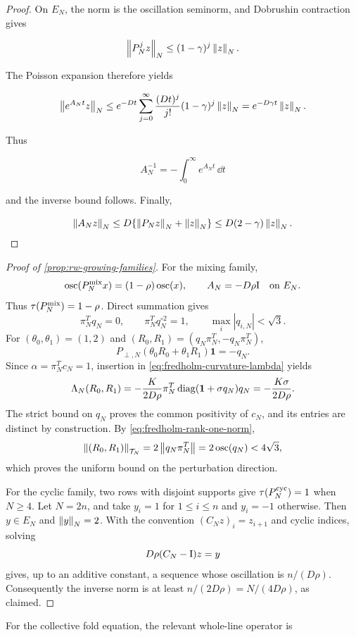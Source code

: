 \begin{proof}
On \(E_N\), the norm is the oscillation seminorm, and Dobrushin
contraction gives

\[
 \left\lVert P_N^jz\right\rVert_N\le(1-\gamma)^j\left\lVert z\right\rVert_N.
\]

The Poisson expansion therefore yields

\[
 \left\lVert e^{A_Nt}z\right\rVert_N
 \le e^{-Dt}\sum_{j=0}^\infty
       \frac{(Dt)^j}{j!}(1-\gamma)^j\left\lVert z\right\rVert_N
 =e^{-D\gamma t}\left\lVert z\right\rVert_N.
\]

Thus

\[
 A_N^{-1}=-\int_0^\infty e^{A_Nt}\,\dd t
\]

and the inverse bound follows.  Finally,

\[
 \left\lVert A_Nz\right\rVert_N
 \le D\{\left\lVert P_Nz\right\rVert_N+\left\lVert z\right\rVert_N\}
 \le D(2-\gamma)\left\lVert z\right\rVert_N.
\]
\end{proof}

\begin{proof}[Proof of \cref{prop:rw-growing-families}]

For the mixing family,
\[
 \operatorname{osc}(P_N^{\rm mix}x)=(1-\rho)\operatorname{osc}(x),
 \qquad
 A_N=-D\rho\mathrm I\quad\hbox{on }E_N.
\]
Thus \(\tau(P_N^{\rm mix})=1-\rho\).  Direct summation gives
\[
 \pi_N^Tq_N=0,
 \qquad \pi_N^Tq_N^{\circ2}=1,
 \qquad \max_i|q_{i,N}|<\sqrt3.
\]
For \((\theta_0,\theta_1)=(1,2)\) and
\((R_0,R_1)=(q_N\pi_N^T,-q_N\pi_N^T)\),
\[
 P_{\perp,N}\left(\theta_0R_0+\theta_1R_1\right)\mathbf1=-q_N.
\]
Since \(\alpha=\pi_N^Tc_N=1\), insertion in
\cref{eq:fredholm-curvature-lambda} yields
\[
 \Lambda_N(R_0,R_1)
 =-\frac{K}{2D\rho}\pi_N^T\operatorname{diag}(\mathbf1+\sigma q_N)q_N
 =-\frac{K\sigma}{2D\rho}.
\]
The strict bound on \(q_N\) proves the common positivity of \(c_N\), and its
entries are distinct by construction.  By
\cref{eq:fredholm-rank-one-norm},
\[
 \left\lVert(R_0,R_1)\right\rVert_{\mathcal T_N}
 =2\left\lVert q_N\pi_N^T\right\rVert=2\operatorname{osc}(q_N)<4\sqrt3,
\]
which proves the uniform bound on the perturbation direction.

For the cyclic family, two rows with disjoint supports give
\(\tau(P_N^{\rm cyc})=1\) when \(N\ge4\).  Let \(N=2n\), and take
\(y_i=1\) for \(1\le i\le n\) and \(y_i=-1\) otherwise.  Then
\(y\in E_N\) and \(\left\lVert y\right\rVert_N=2\).  With the convention
\((C_Nz)_i=z_{i+1}\) and cyclic indices, solving
\[
 D\rho(C_N-\mathrm I)z=y
\]
gives, up to an additive constant, a sequence whose oscillation is
\(n/(D\rho)\).  Consequently the inverse norm is at least
\(n/(2D\rho)=N/(4D\rho)\), as claimed.
\end{proof}

For the collective fold equation, the relevant whole-line operator is

